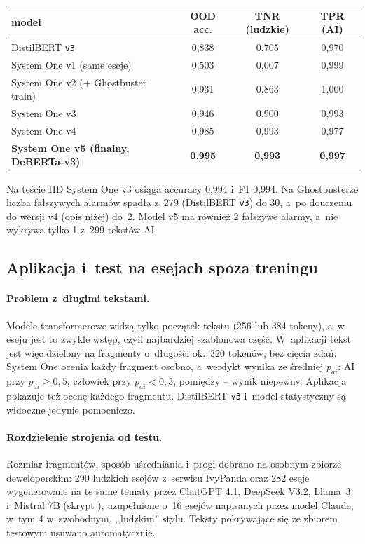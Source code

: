 \begin{center}
\small
\begin{tabular}{|l|c|c|c|}
\hline
model & OOD acc. & TNR (ludzkie) & TPR (AI) \\
\hline
DistilBERT \texttt{v3} & 0,838 & 0,705 & 0,970 \\
System One v1 (same eseje) & 0,503 & 0,007 & 0,999 \\
System One v2 (+ Ghostbuster train) & 0,931 & 0,863 & 1,000 \\
System One v3 & 0,946 & 0,900 & 0,993 \\
System One v4 & 0,985 & 0,993 & 0,977 \\
\textbf{System One v5 (finalny, DeBERTa-v3)} & \textbf{0,995} & \textbf{0,993} & \textbf{0,997} \\
\hline
\end{tabular}
\end{center}

Na teście IID System One v3 osiąga accuracy 0,994 i~F1 0,994. Na Ghostbusterze
liczba fałszywych alarmów spadła z~279 (DistilBERT \texttt{v3}) do 30, a~po
douczeniu do wersji v4 (opis niżej) do~2. Model v5 ma również 2 fałszywe alarmy, a~nie wykrywa tylko 1 z~299 tekstów AI.

\subsection{Aplikacja i~test na esejach spoza treningu}

\paragraph{Problem z~długimi tekstami.}
Modele transformerowe widzą tylko początek tekstu (256 lub 384 tokeny), a~w
eseju jest to zwykle wstęp, czyli najbardziej szablonowa część. W~aplikacji
tekst jest więc dzielony na fragmenty o~długości ok.\ 320 tokenów, bez cięcia
zdań. System One ocenia każdy fragment osobno, a~werdykt wynika ze średniej
\(p_{ai}\): AI przy \(p_{ai} \ge 0{,}5\), człowiek przy \(p_{ai} < 0{,}3\),
pomiędzy -- wynik niepewny. Aplikacja pokazuje też ocenę każdego fragmentu.
DistilBERT \texttt{v3} i~model statystyczny są widoczne jedynie pomocniczo.

\paragraph{Rozdzielenie strojenia od testu.}
Rozmiar fragmentów, sposób uśredniania i~progi dobrano na osobnym zbiorze
deweloperskim: 290 ludzkich esejów z~serwisu IvyPanda oraz 282 eseje
wygenerowane na te same tematy przez ChatGPT 4.1, DeepSeek V3.2, Llama~3
i~Mistral 7B (skrypt ), uzupełnione o~16 esejów
napisanych przez model Claude, w~tym 4 w~swobodnym, ,,ludzkim'' stylu. Teksty
pokrywające się ze zbiorem testowym usuwano automatycznie.

